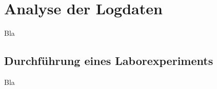 \section{Analyse der Logdaten}
\label{chap:log_analysis}

Bla

\subsection{Durchführung eines Laborexperiments}
\label{chap:labroratory_experiment}

Bla
